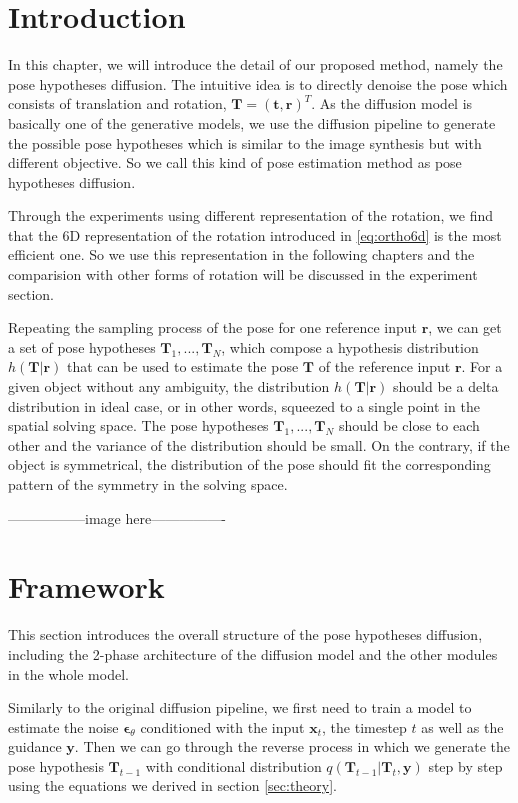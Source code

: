 \documentclass[12pt,DIV14,BCOR12mm,a4paper,footinclude=false,headinclude,parskip=half-,twoside,openright,cleardoublepage=empty,toc=index,bibliography=totoc,listof=totoc]{scrreprt}
\numberwithin{equation}{chapter}
\begin{document}
\section{Introduction}
In this chapter, we will introduce the detail of our proposed method, namely the pose hypotheses diffusion. The intuitive idea is to directly denoise the pose which consists of translation and rotation, $\mathbf{T} = (\mathbf{t}, \mathbf{r})^{T}$. As the diffusion model is basically one of the generative models, we use the diffusion pipeline to generate the possible pose hypotheses which is similar to the image synthesis but with different objective. So we call this kind of pose estimation method as pose hypotheses diffusion.

Through the experiments using different representation of the rotation, we find that the 6D representation of the rotation introduced in \ref{eq:ortho6d} is the most efficient one. So we use this representation in the following chapters and the comparision with other forms of rotation will be discussed in the experiment section.

Repeating the sampling process of the pose for one reference input $\mathbf{r}$, we can get a set of pose hypotheses $\mathbf{T}_{1},...,\mathbf{T}_{N}$, which compose a hypothesis distribution $h(\mathbf{T}|\mathbf{r})$ that can be used to estimate the pose $\mathbf{T}$ of the reference input $\mathbf{r}$. For a given object without any ambiguity, the distribution $h(\mathbf{T}|\mathbf{r})$ should be a delta distribution in ideal case, or in other words, squeezed to a single point in the spatial solving space. The pose hypotheses $\mathbf{T}_{1},...,\mathbf{T}_{N}$ should be close to each other and the variance of the distribution should be small. On the contrary, if the object is symmetrical, the distribution of the pose should fit the corresponding pattern of the symmetry in the solving space. 

-----------------image here----------------

\section{Framework}
This section introduces the overall structure of the pose hypotheses diffusion, including the 2-phase architecture of the diffusion model and the other modules in the whole model.

Similarly to the original diffusion pipeline, we first need to train a model to estimate the noise $\boldsymbol{\epsilon}_{\theta}$ conditioned with the input $\mathbf{x}_{t}$, the timestep $t$ as well as the guidance $\mathbf{y}$. Then we can go through the reverse process in which we generate the pose hypothesis $\mathbf{T}_{t-1}$ with conditional distribution $q(\mathbf{T}_{t-1}|\mathbf{T}_{t},\mathbf{y})$ step by step using the equations we derived in section \ref{sec:theory}.
\end{document}
